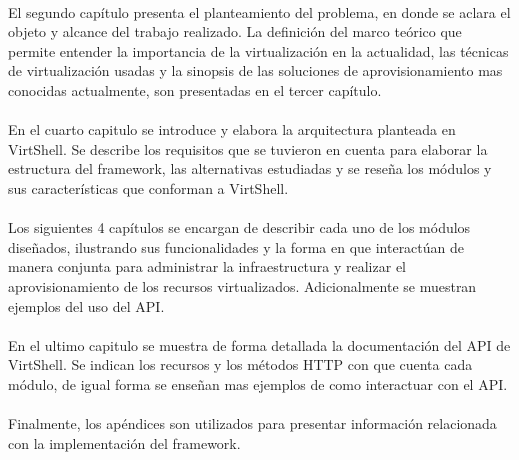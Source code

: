 \\
El segundo capítulo presenta el planteamiento del problema, en donde se aclara el objeto y alcance del trabajo realizado. La definición del marco teórico que permite entender la importancia de la virtualización en la actualidad, las técnicas de virtualización usadas y la sinopsis de las soluciones de aprovisionamiento mas conocidas actualmente, son presentadas en el tercer capítulo.\\
\\
En el cuarto capitulo se introduce y elabora la arquitectura planteada en VirtShell. Se describe los requisitos que se tuvieron en cuenta para elaborar la estructura del framework, las alternativas estudiadas y se reseña los módulos y sus características que conforman a VirtShell.\\
\\
Los siguientes 4 capítulos se encargan de describir cada uno de los módulos diseñados, ilustrando sus funcionalidades y la forma en que interactúan de manera conjunta para administrar la infraestructura y realizar el aprovisionamiento de los recursos virtualizados. Adicionalmente se muestran ejemplos del uso del API.\\
\\
En el ultimo capitulo se muestra de forma detallada la documentación del API de VirtShell. Se indican los recursos y los métodos HTTP con que cuenta cada módulo, de igual forma se enseñan mas ejemplos de como interactuar con el API.\\
\\
Finalmente, los apéndices son utilizados para presentar información relacionada con la implementación del framework.